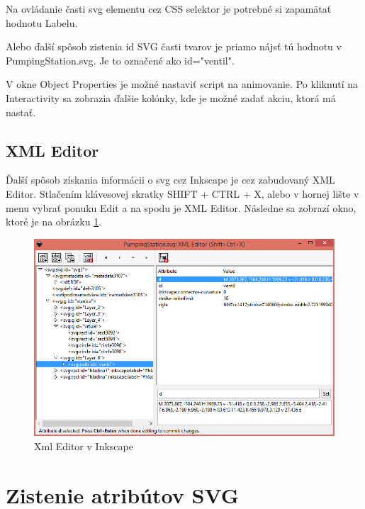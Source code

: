 Na ovládanie časti svg elementu cez CSS selektor je potrebné si zapamätať hodnotu Labelu.  %

Alebo ďalší spôsob zistenia id SVG časti tvarov je priamo nájsť tú hodnotu v PumpingStation.svg. Je to označené ako id="ventil".

V okne Object Properties je možné nastaviť script na animovanie. Po kliknutí na Interactivity sa zobrazia ďalšie kolónky, kde je možné zadať akciu, ktorá má nastať.  



\subsection{XML Editor}
Ďalší spôsob získania informácii o svg cez Inkscape je cez zabudovaný XML Editor.
Stlačením klávesovej skratky SHIFT + CTRL + X, alebo v hornej lište v menu vybrať ponuku Edit a na spodu je XML Editor. Následne sa zobrazí okno, ktoré je na obrázku \ref{xmlEditor}.
\begin{figure}[H]
	\begin{center}
		\includegraphics[width=0.7\linewidth]  {obrazky/XmlEditor2.png}
		\caption{Xml Editor v Inkscape}
		\label{xmlEditor}
	\end{center}
\end{figure}


\section{Zistenie atribútov SVG}

